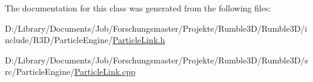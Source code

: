 The documentation for this class was generated from the following files\+:\begin{DoxyCompactItemize}
\item 
D\+:/\+Library/\+Documents/\+Job/\+Forschungsmaster/\+Projekte/\+Rumble3\+D/\+Rumble3\+D/include/\+R3\+D/\+Particle\+Engine/\mbox{\hyperlink{_particle_link_8h}{Particle\+Link.\+h}}\item 
D\+:/\+Library/\+Documents/\+Job/\+Forschungsmaster/\+Projekte/\+Rumble3\+D/\+Rumble3\+D/src/\+Particle\+Engine/\mbox{\hyperlink{_particle_link_8cpp}{Particle\+Link.\+cpp}}\end{DoxyCompactItemize}
